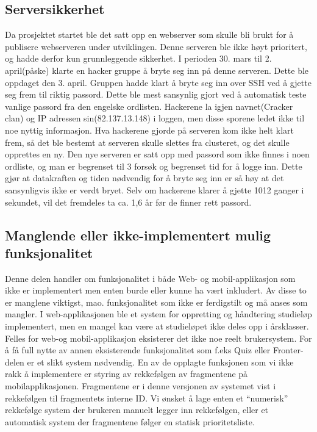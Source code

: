 \documentclass[../main.tex]{subfiles}
\begin{document}
\subsection{Serversikkerhet}

Da prosjektet startet ble det satt opp en webserver som skulle bli brukt for å publisere webserveren under utviklingen. Denne serveren ble ikke høyt prioritert, og hadde derfor kun grunnleggende sikkerhet. \newline
I perioden 30. mars til 2. april(påske) klarte en hacker gruppe å bryte seg inn på denne serveren. Dette ble oppdaget den 3. april. Gruppen hadde klart å bryte seg inn over SSH ved å gjette seg frem til riktig passord. Dette ble mest sansynlig gjort ved å automatisk teste vanlige passord fra den engelske ordlisten. Hackerene la igjen navnet(Cracker clan) og IP adressen sin(82.137.13.148) i loggen, men disse sporene ledet ikke til noe nyttig informasjon. \newline
Hva hackerene gjorde på serveren kom ikke helt klart frem, så det ble bestemt at serveren skulle slettes fra clusteret, og det skulle opprettes en ny. \newline
Den nye serveren er satt opp med passord som ikke finnes i noen ordliste, og man er begrenset til 3 forsøk og begrenset tid for å logge inn. Dette gjør at datakraften og tiden nødvendig for å bryte seg inn er så høy at det sansynligvis ikke er verdt bryet. Selv om hackerene klarer å gjette 1012 ganger i sekundet, vil det fremdeles ta ca. 1,6 år før de finner rett passord. 

\subsection{Manglende eller ikke-implementert mulig funksjonalitet}

Denne delen handler om funksjonalitet i både Web- og mobil-applikasjon som ikke er implementert men enten burde eller kunne ha vært inkludert. Av disse to er manglene viktigst, mao. funksjonalitet som ikke er ferdigstilt og må anses som mangler. \newline
\newline
I web-applikasjonen ble et system for oppretting og håndtering studieløp implementert, men en mangel kan være at studieløpet ikke deles opp i årsklasser. \newline
\newline
Felles for web-og mobil-applikasjon eksisterer det ikke noe reelt brukersystem. For å få full nytte av annen eksisterende funksjonalitet som f.eks Quiz eller Fronter-delen er et slikt system nødvendig.\newline
\newline
En av de opplagte funksjonen som vi ikke rakk å implementere er styring av rekkefølgen av fragmentene på mobilapplikasjonen. Fragmentene er i denne versjonen av systemet vist i rekkefølgen til fragmentets interne ID. Vi ønsket å lage enten et “numerisk” rekkefølge system der brukeren manuelt legger inn rekkefølgen, eller et automatisk system der fragmentene følger en statisk prioritetsliste. 
\end{document}
